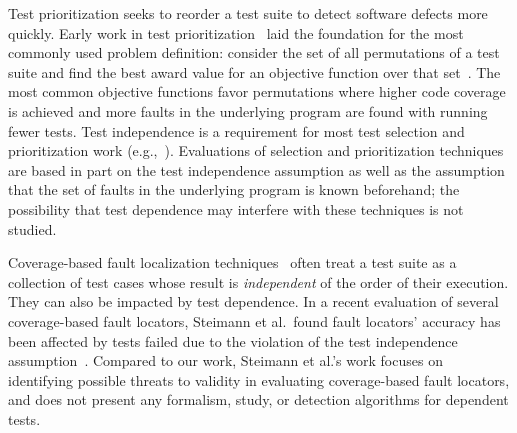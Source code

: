 Test prioritization seeks to reorder a test suite to detect
software defects more quickly. 
Early work in test
prioritization~\cite{Wong:1997:SER:851010.856115,Rothermel:1999:TCP:519621.853398}
laid the foundation for the most commonly used problem definition:
consider the set of all permutations of a test suite and find the best
award value for an objective function over that
set~\cite{Elbaum:2000:PTC:347324.348910}.  The most common objective
functions favor permutations where higher code coverage
is achieved and more faults in the underlying
program  are found with running fewer tests.
Test independence is
a requirement for most test selection and prioritization work (e.g.,~\cite[p.~1500]{Rummel:2005:TPR:1066677.1067016}).
Evaluations of selection and prioritization techniques~\cite[\emph{et alia}]{Rothermel:1999:TCP:519621.853398,Do:2010:ETC:1907658.1908088}
are based in part on the test independence
assumption as well as the assumption that the set of faults in the underlying
program is known beforehand; the possibility that test dependence may
interfere with these techniques is not studied.



Coverage-based fault localization techniques~\cite{Jones:2002:VTI}
often treat a test suite as a collection of test cases
whose result is \textit{independent} of the order of their
execution. They can also be impacted by test dependence.
In a recent evaluation of several coverage-based fault locators,
 Steimann et al.\ found fault locators' accuracy has been 
 affected by tests failed due to the violation of the test
 independence assumption~\cite{Steimann:2013}. 
 Compared to our work, Steimann et al.'s
 work focuses on identifying possible threats to validity
 in evaluating coverage-based fault locators, and does
 not present any formalism, study, or detection algorithms
 for dependent tests.

